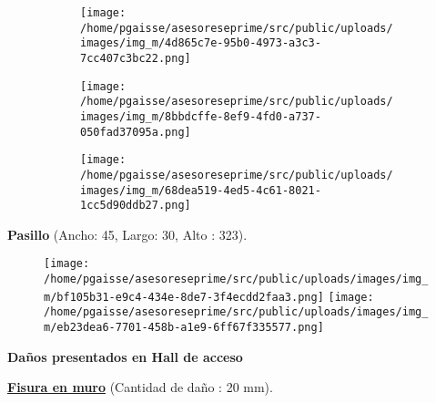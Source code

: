 \documentclass{article}
\begin{document}
      \par\vspace{0.5cm}
                \begin{figure}[H]
                \begin{subfigure}[b]{0.3\textwidth}\centering\texttt{[image: /home/pgaisse/asesoreseprime/src/public/uploads/images/img\_m/4d865c7e-95b0-4973-a3c3-7cc407c3bc22.png]}\end{subfigure}
                \begin{subfigure}[b]{0.3\textwidth}\centering\texttt{[image: /home/pgaisse/asesoreseprime/src/public/uploads/images/img\_m/8bbdcffe-8ef9-4fd0-a737-050fad37095a.png]}\end{subfigure}
                \begin{subfigure}[b]{0.3\textwidth}\centering\texttt{[image: /home/pgaisse/asesoreseprime/src/public/uploads/images/img\_m/68dea519-4ed5-4c61-8021-1cc5d90ddb27.png]}\end{subfigure}
            \end{figure}\begin{center}\large\textbf{Pasillo} (Ancho: 45, Largo: 30, Alto : 323).\end{center}\par
      \par 
                    \begin{figure}[H]
                    \centering
                    \texttt{[image: /home/pgaisse/asesoreseprime/src/public/uploads/images/img\_m/bf105b31-e9c4-434e-8de7-3f4ecdd2faa3.png]}
                    \hspace{0.5cm}
                    \texttt{[image: /home/pgaisse/asesoreseprime/src/public/uploads/images/img\_m/eb23dea6-7701-458b-a1e9-6ff67f335577.png]}
                    \end{figure} \begin{center}\textbf{{\large Daños presentados en Hall de acceso}}\end{center} \textbf{\underline{Fisura en muro}} (Cantidad de daño : 20 mm).\par
      \par\vspace{0.5cm}
\end{document}
